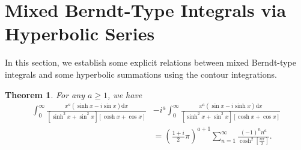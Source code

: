 \documentclass[11pt]{article}
\let\oldsection\section
\renewcommand\section{\setcounter{equation}{0}\oldsection}
\theoremstyle{plain}
\newtheorem{thm}{Theorem}[section]
\theoremstyle{definition}
\begin{document}
\section{Mixed Berndt-Type Integrals via Hyperbolic Series}
In this section, we  establish some explicit relations between  mixed Berndt-type integrals and some hyperbolic summations  using the contour integrations.
\begin{thm}\label{thm1cosh++}
For any  $a\ge 1$, we have
\begin{align}\label{onecosh++}
\int_0^{\infty}{\frac{x^a\left( \sinh x-i\sin x \right) \mathrm{d}x}{\left[ \sinh ^2x+\sin ^2x \right] \left[ \cosh x+\cos x \right]}}&-i^a\int_0^{\infty}{\frac{x^a\left( \sin x-i\sinh x \right) \mathrm{d}x}{\left[ \sinh ^2x+\sin ^2x \right] \left[ \cosh x+\cos x \right]}}
\nonumber\\
&=\left( \frac{1+i}{2}\pi \right) ^{a+1}\sum_{n=1}^{\infty}{\frac{\left( -1 \right) ^nn^a}{\cosh ^2\left[ \tfrac{n\pi}{2} \right]}}.
\end{align}	
\end{thm}
\end{document}
